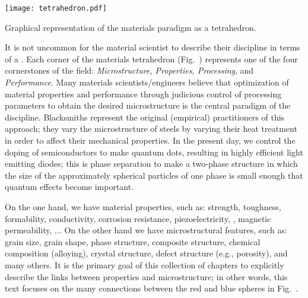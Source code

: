 \begin{floatingfigure}[r]{3.2in}
\centering
{\texttt{[image: tetrahedron.pdf]}}
{\caption{\small Graphical representation of the materials paradigm as a tetrahedron.}}
\end{floatingfigure}
\noindent It is not uncommon for the material scientist to describe their discipline in terms of a .  Each corner of the materials tetrahedron (Fig.~) represents one of the four cornerstones of the field: \textit{Microstructure, Properties, Processing}, and \textit{Performance}. Many materials scientists/engineers believe that optimization of material properties and performance through judicious control of processing parameters to obtain the desired microstructure is the central paradigm of the discipline.  Blacksmiths represent the original (empirical) practitioners of this approach; they vary the microstructure of steels by varying their heat treatment in order to affect their mechanical properties.  In the present day, we control the doping of semiconductors to make quantum dots, resulting in highly efficient light emitting diodes; this is phase separation to make a two-phase structure in which the size of the approximately spherical particles of one phase is small enough that quantum effects become important.

On the one hand, we have material properties, such as: strength, toughness, formability, conductivity, corrosion resistance, piezoelectricity, , magnetic permeability, $\ldots$ On the other hand we have microstructural features, such as: grain size, grain shape, phase structure, composite structure, chemical composition (alloying), crystal structure, defect structure (e.g., porosity), and many others. It is the primary goal of this collection of chapters to explicitly describe the links between properties and microstructure; in other words, this text focuses on the many connections between the red and blue spheres in Fig.~.\\  

